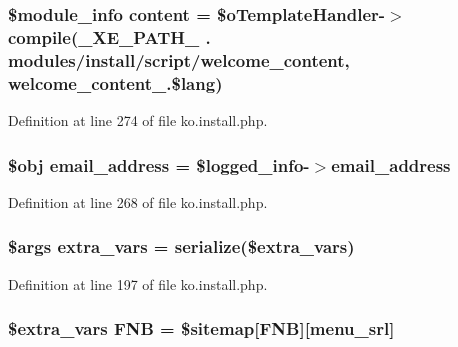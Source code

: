 \subsubsection[{\texorpdfstring{content}{content}}]{\setlength{\rightskip}{0pt plus 5cm}\$module\+\_\+info {\bf content} = \$o\+Template\+Handler-\/$>$compile({\bf \+\_\+\+X\+E\+\_\+\+P\+A\+T\+H\+\_\+} . \textquotesingle{}modules/{\bf install}/script/welcome\+\_\+content\textquotesingle{}, \textquotesingle{}welcome\+\_\+content\+\_\+\textquotesingle{}.\${\bf lang})}\hypertarget{ko_8install_8php_a65dddc3e5e47cb506e6b5417ffb3bdef}{}\label{ko_8install_8php_a65dddc3e5e47cb506e6b5417ffb3bdef}


Definition at line 274 of file ko.\+install.\+php.

\subsubsection[{\texorpdfstring{email\+\_\+address}{email_address}}]{\setlength{\rightskip}{0pt plus 5cm}\$obj email\+\_\+address = \$logged\+\_\+info-\/$>$email\+\_\+address}\hypertarget{ko_8install_8php_a1dffea0d5ba8194f8ef01f414af0c831}{}\label{ko_8install_8php_a1dffea0d5ba8194f8ef01f414af0c831}


Definition at line 268 of file ko.\+install.\+php.

\subsubsection[{\texorpdfstring{extra\+\_\+vars}{extra_vars}}]{\setlength{\rightskip}{0pt plus 5cm}\$args extra\+\_\+vars = serialize(\$extra\+\_\+vars)}\hypertarget{ko_8install_8php_ae1dcb37fc34a8f312d2e6abd6f806743}{}\label{ko_8install_8php_ae1dcb37fc34a8f312d2e6abd6f806743}


Definition at line 197 of file ko.\+install.\+php.

\subsubsection[{\texorpdfstring{F\+NB}{FNB}}]{\setlength{\rightskip}{0pt plus 5cm}\${\bf extra\+\_\+vars} F\+NB = \$sitemap\mbox{[}\textquotesingle{}F\+NB\textquotesingle{}\mbox{]}\mbox{[}\textquotesingle{}menu\+\_\+srl\textquotesingle{}\mbox{]}}\hypertarget{ko_8install_8php_a683e060c22be3e658be6f9751a2082f0}{}\label{ko_8install_8php_a683e060c22be3e658be6f9751a2082f0}


